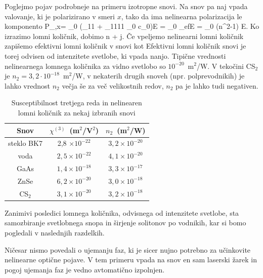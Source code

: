 Poglejmo pojav podrobneje na primeru izotropne snovi. Na snov pa naj vpada valovanje, ki je polarizirano
v smeri $x$, tako da ima nelinearna polarizacija le komponento 
\beq
P_{,x}=
\epsilon_{0} \left(\chi_{11} + \chi_{1111}
{\varepsilon_0  c_0}\right)E = \varepsilon_0 \chi_{ef}E = \varepsilon_0 (n^2-1) E.
\eeq
Ko izrazimo lomni količnik, dobimo
\beq
n \approx {} +  j.
\eeq
Če vpeljemo nelinearni lomni količnik
zapišemo efektivni lomni količnik v snovi kot
Efektivni lomni količnik snovi je torej odvisen od intenzitete svetlobe, ki vpada nanjo. 
Tipične vrednosti nelinearnega lomnega količnika za vidno svetlobo so $10^{-20}$~m$^2$/W.
V tekočini CS$_2$ je $n_2 = 3,2 \cdot 10^{-18}$~m$^2$/W, v nekaterih 
drugih snoveh (npr. polprevodnikih) je lahko vrednost $n_2$ večja še za več 
velikostnih redov, $n_2$ pa je lahko tudi negativen. 

\begin{table}[h]
 \centering
\begin{tabular}{|c|c|c|} \hline  
      Snov & $\chi^{(3)}$~(m$^2$/V$^2$) & $n_2$~(m$^2$/W)\\ \hline
     steklo BK7 & 2,8 $\times 10^{-22}$ & $3,2 \times 10^{-20}$ \\ \hline
     voda & $2,5 \times 10^{-22}$ & $4,1 \times 10^{-20}$ \\ \hline
     GaAs & $1,4 \times 10^{-18}$ & $3,3 \times 10^{-17}$ \\ \hline
     ZnSe & $6,2 \times 10^{-20}$ & $3,0 \times 10^{-18}$ \\ \hline
     CS$_2$ & $3,1 \times 10^{-20}$ & $3,2 \times 10^{-18}$ \\ \hline 
\end{tabular}
  \caption{Susceptibilnost tretjega reda in nelinearen lomni količnik za nekaj izbranih snovi}
\label{table:chi3}
\end{table}

Zanimivi posledici lomnega količnika, odvisnega od intenzitete svetlobe, 
sta samozbiranje svetlobnega snopa in širjenje solitonov po vodnikih, 
kar si bomo pogledali v naslednjih
razdelkih.

\begin{remark}
Ničesar nismo povedali o ujemanju faz, ki je sicer nujno potrebno za učinkovite nelinearne 
optične pojave. V tem primeru vpada na snov en sam laserski žarek in pogoj ujemanja faz
je vedno avtomatično izpolnjen. 
\end{remark}

